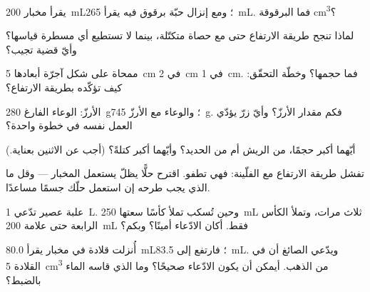 \begin{exercise}[$\star$]\label{exo:g6:mass-and-volume:4}
يقرأ مخبار \qty{200}{mL}؛ ومع إنزال حبّة برقوق فيه يقرأ
\qty{265}{mL}. فما  البرقوقة  \unit{cm^3}؟
\end{exercise}

\begin{exercise}[$\star$]\label{exo:g6:mass-and-volume:5}
لماذا تنجح طريقة الارتفاع حتى مع حصاة متكتّلة، بينما لا تستطيع
أي مسطرة قياسها؟ وأيّ قضية تجيب؟
\end{exercise}

\begin{exercise}[$\star$]\label{exo:g6:mass-and-volume:6}
ممحاة على شكل آجرّة أبعادها \qty{5}{cm} في \qty{2}{cm} في
\qty{1}{cm}. فما حجمها؟ وخطّة التحقّق: كيف تؤكّده بطريقة
الارتفاع؟
\end{exercise}

\begin{exercise}[$\star$]\label{exo:g6:mass-and-volume:7}
 الأرزّ: الوعاء الفارغ \qty{280}{g}؛ والوعاء مع الأرزّ
\qty{745}{g}. فكم مقدار الأرزّ؟ وأيّ زرّ يؤدّي العمل نفسه في
خطوة واحدة؟
\end{exercise}

\begin{exercise}[$\star$]\label{exo:g6:mass-and-volume:8}
أيّهما أكبر حجمًا،  من الريش أم  من الحديد؟
وأيّهما أكبر كتلةً؟ (أجب عن الاثنين بعناية.)
\end{exercise}

\begin{exercise}[$\star\star$]\label{exo:g6:mass-and-volume:9}
تفشل طريقة الارتفاع مع الفلّينة: فهي تطفو. اقترح حلًّا يظلّ
يستعمل المخبار --- وقل ما الذي يجب طرحه إن استعمل حلّك جسمًا
مساعدًا.
\end{exercise}

\begin{exercise}[$\star\star$]\label{exo:g6:mass-and-volume:10}
علبة عصير تدّعي \qty{1}{L}. وحين تُسكب تملأ كأسًا سعتها
\qty{250}{mL} ثلاث مرات، وتملأ الكأس الرابعة حتى علامة
\qty{200}{mL} فقط. أكان الادّعاء أمينًا؟ وبكم؟
\end{exercise}

\begin{exercise}[$\star\star$]\label{exo:g6:mass-and-volume:11}
أُنزلت قلادة في مخبار يقرأ \qty{80.0}{mL}؛ فارتفع إلى
\qty{83.5}{mL}. ويدّعي الصائغ أن في القلادة \qty{5}{cm^3} من
الذهب. أيمكن أن يكون الادّعاء صحيحًا؟ وما الذي قاسه الماء
بالضبط؟
\end{exercise}

